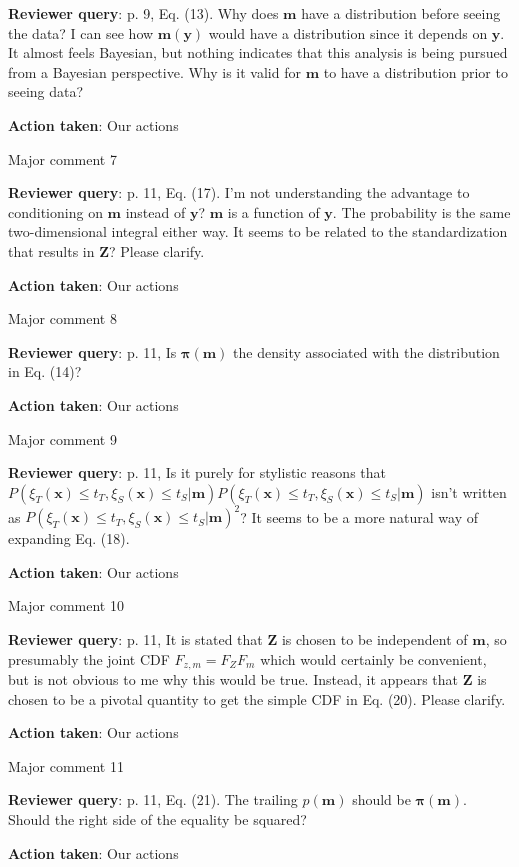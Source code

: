 \documentclass[a4paper]{article}
\newcommand{\bm}{ {\boldsymbol m} }
\newcommand{\bx}{ {\boldsymbol x} }
\newcommand{\by}{ {\boldsymbol y} }
\newcommand{\bZ}{ {\boldsymbol Z} }
\newcommand{\bpi}{ {\boldsymbol \pi} }
\def\reply{\textbf{Reviewer query}}
\def\action{\textbf{Action taken}}
\begin{document}
\begin{answers}
\reply: p. 9, Eq. (13). Why does $\bm$ have a distribution before seeing the data? I can see how $\bm(\by)$ would have a distribution since it depends on $\by$. It almost feels Bayesian, but nothing indicates that this analysis is being pursued from a Bayesian perspective. Why is it valid for $\bm$ to have a distribution prior to seeing data?

\action: Our actions

\item{Major comment 7}\label{q18}

\reply: p. 11, Eq. (17). I’m not understanding the advantage to conditioning on $\bm$ instead of $\by$? $\bm$ is a function of $\by$. The probability is the same two-dimensional integral either way. It seems to be related to the standardization that results in $\bZ$? Please clarify.

\action: Our actions

\item{Major comment 8}\label{q19}

\reply: p. 11, Is $\bpi(\bm)$ the density associated with the distribution in Eq. (14)? 

\action: Our actions

\item{Major comment 9}\label{q20}

\reply: p. 11, Is it purely for stylistic reasons that $P(\xi_T(\bx) \leq t_T, \xi_S(\bx) \leq t_S |\bm)P(\xi_T(\bx) \leq t_T, \xi_S(\bx) \leq t_S |\bm)$ isn’t written as $P(\xi_T(\bx) \leq t_T, \xi_S(\bx) \leq t_S |\bm)^2$? It seems to be a more natural way of expanding Eq. (18). 

\action: Our actions

\item{Major comment 10}\label{q21}

\reply: p. 11, It is stated that $\bZ$ is chosen to be independent of $\bm$, so presumably the joint CDF $F_{z,m}=F_{Z}F_m$ which would certainly be convenient, but is not obvious to me why this would be true. 
Instead, it appears that $\bZ$ is chosen to be a pivotal quantity to get the simple CDF in Eq. (20). Please clarify.

\action: Our actions

\item{Major comment 11}\label{q22}

\reply: p. 11, Eq. (21). The trailing $p(\bm)$ should be $\bpi(\bm)$. Should the right side of the equality be squared? 

\action: Our actions


\end{answers}
\end{document}
